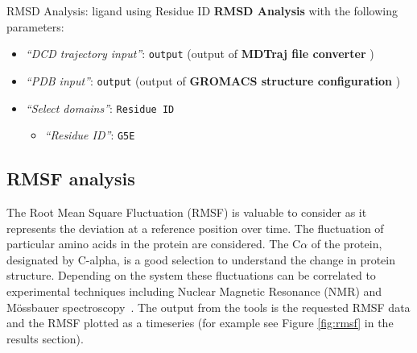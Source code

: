\documentclass[twocolumn]{bmcart}%
\providecommand{\tightlist}{%
  \setlength{\itemsep}{0pt}\setlength{\parskip}{0pt}}
\begin{document}

\begin{handson_box_colour}{RMSD Analysis: ligand using Residue ID}
  \textbf{RMSD Analysis} with the following parameters:

  \begin{itemize}
  \tightlist
  \item
    \emph{``DCD trajectory input''}: \texttt{output} (output of
    \textbf{MDTraj file converter} )
  \item
    \emph{``PDB input''}: \texttt{output} (output of \textbf{GROMACS
    structure configuration} )
  \item
    \emph{``Select domains''}: \texttt{Residue\ ID}

    \begin{itemize}
    \tightlist
    \item
      \emph{``Residue ID''}: \texttt{G5E}
    \end{itemize}
  \end{itemize}



\end{handson_box_colour}



\hypertarget{rmsf-analysis}{%
\subsection*{RMSF analysis}\label{rmsf-analysis}}

The Root Mean Square Fluctuation (RMSF) is valuable to consider as it represents the deviation at a reference position over time. The fluctuation of particular amino acids in the protein are considered. The C$\alpha$ of the protein, designated by C-alpha, is a good selection to understand the change in protein structure. Depending on the system these fluctuations can be correlated to experimental techniques including Nuclear Magnetic Resonance (NMR) and M\"{o}ssbauer spectroscopy~\cite{berjanskii_nmr_2006,kuzmanic_determination_2010}. The output from the tools is the requested RMSF data and the RMSF plotted as a timeseries (for example see Figure \ref{fig:rmsf} in the results section).
\end{document}
